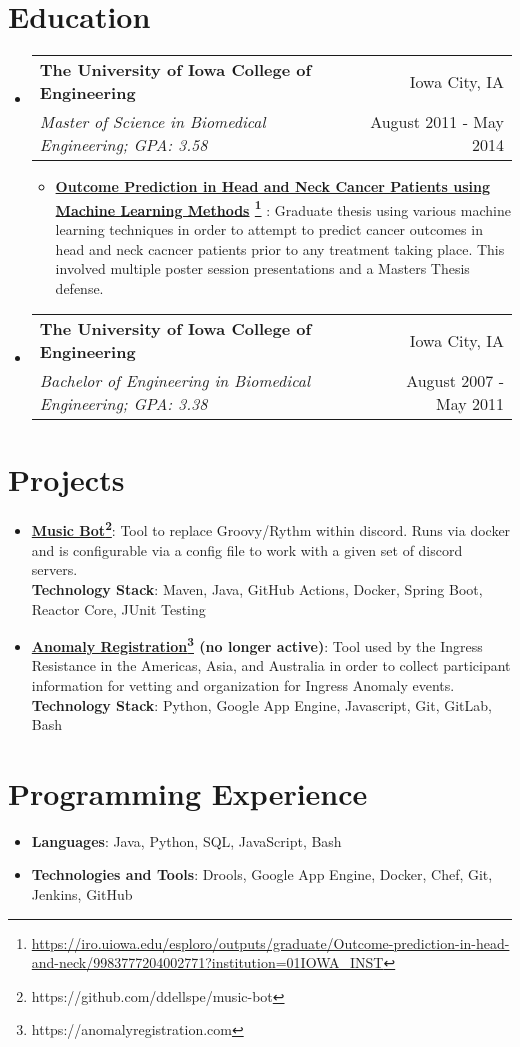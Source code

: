 \documentclass[letterpaper,11pt]{article}
\makeatletter
\newcommand{\resumeItem}[2]{
  \item\small{
    \textbf{#1}{: #2 \vspace{-2pt}}
  }
}
\newcommand{\resumeItemWithTech}[3]{
  \item\small{
    \textbf{#1}{: #2 \vspace{-2pt}}\\
    \textbf{Technology Stack}{: #3 \vspace{-2pt}}
  }
}
\newcommand{\resumePositionListStart}{\begin{itemize}[leftmargin=*,label={}]}
\newcommand{\resumePositionListEnd}{\end{itemize}}
\newcommand{\resumePosition}[4]{
  \vspace{-1pt}\item
    \begin{tabular*}{0.97\textwidth}{l@{\extracolsep{\fill}}r}
      \textbf{#1} & #2 \\
      \textit{\small#3} & {\small#4} \\
    \end{tabular*}\vspace{-5pt}
}
\newcommand{\resumeSubItemWithTech}[3]{\resumeItemWithTech{#1}{#2}{#3}\vspace{-4pt}}
\newcommand{\resumeItemListStart}{\begin{itemize}}
\newcommand{\resumeItemListEnd}{\end{itemize}\vspace{-5pt}}
\makeatother
\begin{document}
\section{Education}
  \resumePositionListStart
    \resumePosition
      {The University of Iowa College of Engineering}{Iowa City, IA}
      {Master of Science in Biomedical Engineering;  GPA: 3.58}{August 2011 - May 2014}
    \resumeItemListStart
      \resumeItem{
          \href{https://iro.uiowa.edu/esploro/outputs/graduate/Outcome-prediction-in-head-and-neck/9983777204002771?institution=01IOWA_INST}{Outcome Prediction in Head and Neck Cancer Patients using Machine Learning Methods}
          \footnote{\url{https://iro.uiowa.edu/esploro/outputs/graduate/Outcome-prediction-in-head-and-neck/9983777204002771?institution=01IOWA_INST}}
        }
        {
          Graduate thesis using various machine learning techniques in order to attempt to predict cancer outcomes in head and neck cacncer patients prior to any treatment taking place.
          This involved multiple poster session presentations and a Masters Thesis defense.
        }
    \resumeItemListEnd
    \resumePosition
      {The University of Iowa College of Engineering}{Iowa City, IA}
      {Bachelor of Engineering in Biomedical Engineering;  GPA: 3.38}{August 2007 - May 2011}
  \resumePositionListEnd


\section{Projects}
  \resumePositionListStart
    \resumeSubItemWithTech{\href{https://github.com/ddellspe/music-bot}{Music Bot}\footnote{https://github.com/ddellspe/music-bot}}
      {Tool to replace Groovy/Rythm within discord. Runs via docker and is configurable via a config file to work with a given set of discord servers.}
      {Maven, Java, GitHub Actions, Docker, Spring Boot, Reactor Core, JUnit Testing}
    \resumeSubItemWithTech{\href{https://anomalyregistration.com}{Anomaly Registration}\footnote{https://anomalyregistration.com} (no longer active)}
      {Tool used by the Ingress Resistance in the Americas, Asia, and Australia in order to collect participant information for vetting and organization for Ingress Anomaly events.}
      {Python, Google App Engine, Javascript, Git, GitLab, Bash}
  \resumePositionListEnd


\section{Programming Experience}
  \resumePositionListStart
    \item{
      \textbf{Languages}{: Java, Python, SQL, JavaScript, Bash}
    }\vspace{-8pt}
    \item{
      \textbf{Technologies and Tools}{: Drools, Google App Engine, Docker, Chef, Git, Jenkins, GitHub}
    }\vspace{-8pt}
  \resumePositionListEnd
\end{document}
